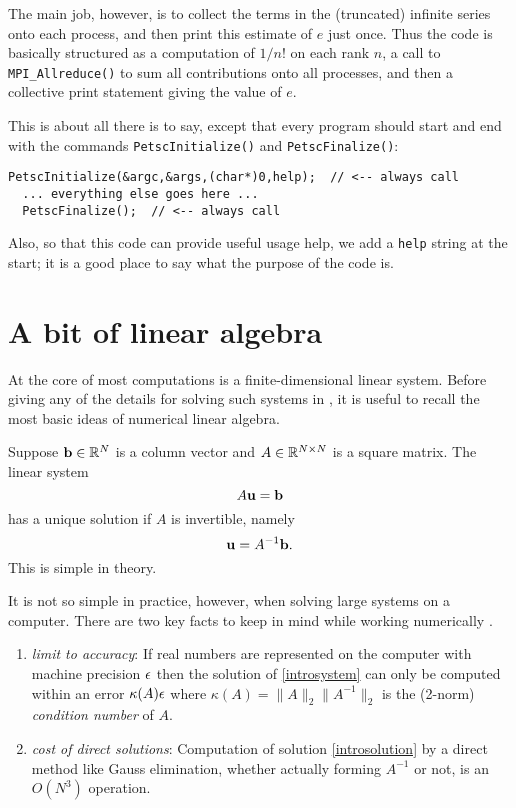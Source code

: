 The main job, however, is to collect the terms in the (truncated) infinite series onto each process, and then print this estimate of $e$ just once.  Thus the code is basically structured as a computation of $1/n!$ on each rank $n$, a call to \texttt{MPI\_Allreduce()} to sum all contributions onto all processes, and then a collective print statement giving the value of $e$.

This is about all there is to say, except that every \PETSc program should start and end with the commands \texttt{PetscInitialize()} and \texttt{PetscFinalize()}:
\begin{Verbatim}[fontsize=\small]
  PetscInitialize(&argc,&args,(char*)0,help);  // <-- always call
  ... everything else goes here ...
  PetscFinalize();  // <-- always call
\end{Verbatim}
Also, so that this \PETSc code can provide useful usage help, we add a \texttt{help} string at the start; it is a good place to say what the purpose of the code is.


\section{A bit of linear algebra}

At the core of most \PETSc computations is a finite-dimensional linear system.  Before giving any of the details for solving such systems in \PETSc, it is useful to recall the most basic ideas of numerical linear algebra.

Suppose $\mathbf{b}\in \mathbb{R}^{N}$ is a column vector and $A\in\mathbb{R}^{N\times N}$ is a square matrix.  The linear system
\begin{equation}
A \mathbf{u} = \mathbf{b} \label{introsystem}
\end{equation}
has a unique solution if $A$ is invertible, namely
\begin{equation}
\mathbf{u} = A^{-1} \mathbf{b}. \label{introsolution}
\end{equation}
This is simple in theory.

It is not so simple in practice, however, when solving large systems on a computer.  There are two key facts to keep in mind while working numerically  \citep{TrefethenBau}.
\renewcommand{\labelenumi}{\roman{enumi})}
\begin{enumerate}
\item \emph{limit to accuracy}:  If real numbers are represented on the computer with machine precision $\epsilon$ then the solution of \eqref{introsystem} can only be computed within an error $\kappa(A) \epsilon$ where $\kappa(A) = \|A\|_2 \|A^{-1}\|_2$ is the (2-norm) \emph{condition number} of $A$.
\item \emph{cost of direct solutions}:  Computation of solution \eqref{introsolution} by a direct method like Gauss elimination, whether actually forming $A^{-1}$ or not, is an $O(N^3)$ operation.
\end{enumerate}

